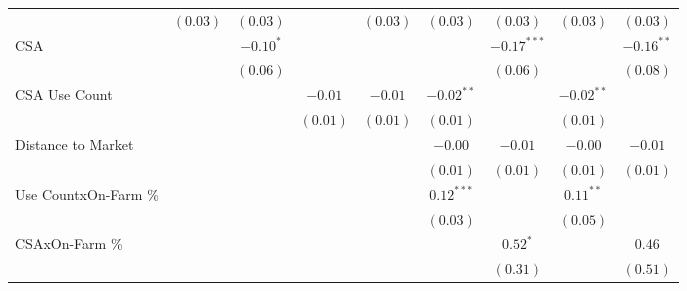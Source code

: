 \documentclass[
]{article}
\begin{document}
\begin{table}
\begin{center}
\begin{tabular}{l c c c c c c c c}
                     & $(0.03)$             & $(0.03)$             &                       & $(0.03)$             & $(0.03)$              & $(0.03)$               & $(0.03)$              & $(0.03)$              \\
CSA                  &                      & $-0.10^{*}$          &                       &                      &                       & $\mathbf{-0.17}^{***}$ &                       & $\mathbf{-0.16}^{**}$ \\
                     &                      & $(0.06)$             &                       &                      &                       & $(0.06)$               &                       & $(0.08)$              \\
CSA Use Count        &                      &                      & $-0.01$               & $-0.01$              & $\mathbf{-0.02}^{**}$ &                        & $\mathbf{-0.02}^{**}$ &                       \\
                     &                      &                      & $(0.01)$              & $(0.01)$             & $(0.01)$              &                        & $(0.01)$              &                       \\
Distance to Market   &                      &                      &                       &                      & $-0.00$               & $-0.01$                & $-0.00$               & $-0.01$               \\
                     &                      &                      &                       &                      & $(0.01)$              & $(0.01)$               & $(0.01)$              & $(0.01)$              \\
Use CountxOn-Farm \% &                      &                      &                       &                      & $\mathbf{0.12}^{***}$ &                        & $\mathbf{0.11}^{**}$  &                       \\
                     &                      &                      &                       &                      & $(0.03)$              &                        & $(0.05)$              &                       \\
CSAxOn-Farm \%       &                      &                      &                       &                      &                       & $0.52^{*}$             &                       & $0.46$                \\
                     &                      &                      &                       &                      &                       & $(0.31)$               &                       & $(0.51)$              \\

\end{tabular}
\end{center}
\end{table}
\end{document}
